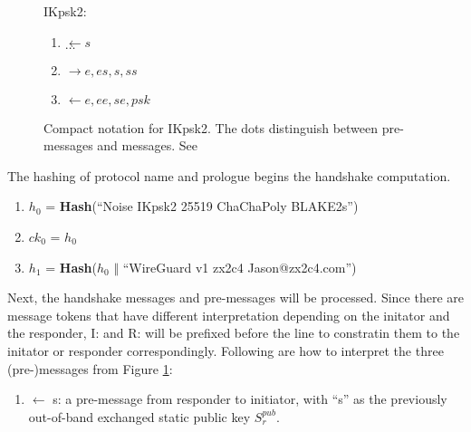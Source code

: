   \begin{figure}[h]
    \begin{center}
      \begin{varwidth}{\textwidth}
      \large IKpsk2:
      \begin{enumerate}
          \item \(\leftarrow s\) \\
          \(\dots\)
          \item \(\rightarrow e, es, s, ss\)
          \item \(\leftarrow e, ee, se, psk\)
      \end{enumerate}
      \end{varwidth}
    \end{center}
    \caption{Compact notation for IKpsk2. The dots distinguish between pre-messages and messages. See \cite[p.~36]{noise}}
    \label{fig:ikpsk}
  \end{figure}

  \setcounter{cnt}{1}
  The hashing of protocol name and prologue begins the handshake computation.
    \begin{center}
      \begin{varwidth}{\textwidth}
      \begin{enumerate} [start = \value{cnt}]
          \item $h_0$ = \textbf{Hash}(``Noise IKpsk2 25519 ChaChaPoly BLAKE2s'')
          \item $ck_0$ = $h_0$
          \item $h_1$ = \textbf{Hash}($h_0$ $\Vert$ ``WireGuard v1 zx2c4 Jason@zx2c4.com'')
          \addtocounter{cnt}{3}
      \end{enumerate}
      \end{varwidth}
    \end{center}
  
  Next, the handshake messages and pre-messages will be processed. Since there are message tokens
  that have different interpretation depending on the initator and the responder, I: and R: will
  be prefixed before the line to constratin them to the initator or responder correspondingly.
  Following are how to interpret the three (pre-)messages from Figure \ref{fig:ikpsk}:

  \setcounter{msg}{0}
  \begin{enumerate} [start = \value{msg}]
    \item $\leftarrow$ s: a pre-message from responder to initiator, with ``s'' as the
    previously out-of-band exchanged static public key $S^{pub}_r$.
    \addtocounter{msg}{1}
  \end{enumerate}

